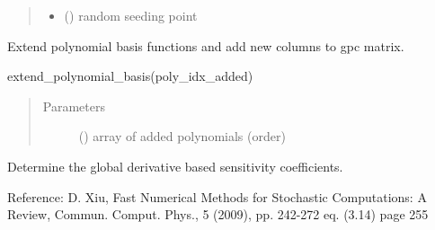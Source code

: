 \documentclass[letterpaper,10pt,english,openany,oneside]{sphinxmanual}
\begin{document}
\begin{fulllineitems}
\begin{fulllineitems}
\begin{quote}
\begin{description}
\begin{itemize}
\item {} 
 (\sphinxstyleliteralemphasis{\sphinxupquote{, }}\sphinxstyleliteralemphasis{\sphinxupquote{, }}) \textendash{} random seeding point

\end{itemize}

\end{description}\end{quote}

\end{fulllineitems}


\begin{fulllineitems}
\label{\detokenize{pygpc:pygpc.gpc.gPC.extend_polynomial_basis}}
Extend polynomial basis functions and add new columns to gpc matrix.

extend\_polynomial\_basis(poly\_idx\_added)
\begin{quote}\begin{description}
\item[{Parameters}] \leavevmode
{} (\sphinxstyleliteralemphasis{\sphinxupquote{{[}}}\sphinxstyleliteralemphasis{\sphinxupquote{{]} }}) \textendash{} array of added polynomials (order)

\end{description}\end{quote}

\end{fulllineitems}


\begin{fulllineitems}
\label{\detokenize{pygpc:pygpc.gpc.gPC.get_global_sens}}
Determine the global derivative based sensitivity coefficients.

Reference:
D. Xiu, Fast Numerical Methods for Stochastic Computations: A Review,
Commun. Comput. Phys., 5 (2009), pp. 242-272 eq. (3.14) page 255


\end{fulllineitems}
\end{fulllineitems}
\end{document}
